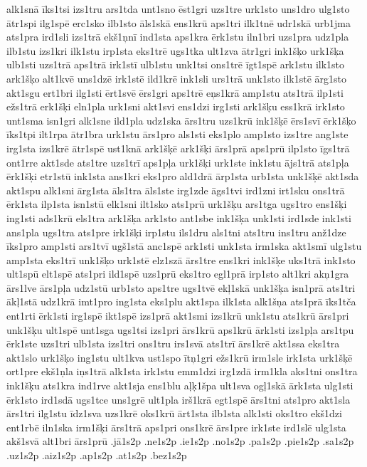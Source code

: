 {alk1snā
īks1tsi
izs1tru
ars1tda
unt1sno
ēst1gri
uzs1tre
urk1sto
uns1dro
ulg1sto
ātr1spi
ilg1spē
erc1sko
ilb1sto
āls1skā
ens1krū
aps1tri
ilk1tnē
udr1skā
urb1jma
ats1pra
ird1sli
izs1trā
ekš1ņnī
ind1sta
aps1kra
ērk1stu
iln1bri
uzs1pra
udz1pla
ilb1stu
izs1kri
ilk1stu
irp1sta
eks1trē
ugs1tka
ult1zva
ātr1gri
ink1šķo
urk1šķa
ulb1sti
uzs1trā
aps1trā
irk1stī
ulb1stu
unk1tsi
ons1trē
īgt1spē
ark1stu
ilk1sto
ark1šķo
alt1kvē
uns1dzē
irk1stē
ild1krē
ink1sli
urs1trā
unk1sto
ilk1stē
ārg1sto
akt1sgu
ert1bri
ilg1sti
ērt1svē
ērs1gri
aps1trē
eņs1krā
amp1stu
ats1trā
ilp1sti
ežs1trā
erk1šķi
eln1pla
urk1sni
akt1svi
ens1dzi
irg1sti
ark1šķu
ess1krā
irk1sto
unt1sma
isn1gri
alk1sne
ild1pla
udz1ska
ārs1tru
uzs1krū
ink1šķē
ērs1svī
ērk1šķo
īks1tpi
ilt1rpa
ātr1bra
urk1stu
ārs1pro
als1sti
eks1plo
amp1sto
izs1tre
ang1ste
irg1sta
izs1krē
ātr1spē
ust1knā
ark1šķē
ark1šķi
ārs1prā
aps1prū
ilp1sto
īgs1trā
ont1rre
akt1sde
ats1tre
uzs1trī
aps1pļa
urk1šķi
urk1ste
ink1stu
ājs1trā
ats1pļa
ērk1šķi
etr1stū
ink1sta
ans1kri
eks1pro
ald1drā
ārp1sta
urb1sta
unk1šķē
akt1sda
akt1spu
alk1sni
ārg1sta
āls1tra
āls1ste
irg1zde
āgs1tvi
ird1zni
irt1sku
ons1trā
ērk1sta
ilp1sta
isn1stū
elk1sni
ilt1sko
ats1prū
urk1šķu
ars1tga
ugs1tro
ens1šķi
ing1sti
ads1krū
els1tra
ark1šķa
ark1sto
ant1sbe
ink1šķa
unk1sti
ird1sde
ink1sti
ans1pla
ugs1tra
ats1pre
irk1šķi
irp1stu
ils1dru
als1tni
ats1tru
ins1tru
anž1dze
īks1pro
amp1sti
ars1tvī
ugš1stā
anc1spē
ark1sti
unk1sta
irm1ska
akt1smī
ulg1stu
amp1sta
eks1trī
unk1šķo
urk1stē
elz1szā
ārs1tre
ens1kri
ink1šķe
uks1trā
ink1sto
ult1spū
elt1spē
ats1pri
ild1spē
uzs1prū
eks1tro
egl1prā
irp1sto
alt1kri
akņ1gra
ārs1lve
ārs1pļa
udz1stū
urb1sto
aps1tre
ugs1tvē
ekļ1skā
unk1šķa
isn1prā
ats1tri
ākļ1stā
udz1krā
imt1pro
ing1sta
eks1plu
akt1spa
ilk1sta
alk1šņa
ats1prā
īks1tča
ent1rti
ērk1sti
irg1spē
ikt1spē
izs1prā
akt1smi
izs1krū
unk1stu
ats1krū
ārs1pri
unk1šķu
ult1spē
unt1sga
ugs1tsi
izs1pri
ārs1krū
aps1krū
ārk1sti
izs1pļa
ars1tpu
ērk1ste
uzs1tri
ulb1sta
izs1tri
ons1tru
irs1svā
ats1trī
ārs1krē
akt1ssa
eks1tra
akt1slo
urk1šķo
ing1stu
ult1kva
ust1spo
ītņ1gri
ežs1krū
irm1sle
irk1sta
urk1šķē
ort1pre
ekš1ņla
iņs1trā
alk1sta
irk1stu
emm1dzi
irg1zdā
irm1kla
aks1tni
ons1tra
ink1šķu
ats1kra
ind1rve
akt1sja
ens1blu
aļķ1špa
ult1sva
ogļ1skā
ārk1sta
ulg1sti
ērk1sto
ird1sdā
ugs1tce
uns1grē
ult1pla
irš1krā
egt1spē
ārs1tni
ats1pro
akt1sla
ārs1tri
ilg1stu
īdz1sva
uzs1krē
oks1krū
ārt1sta
ilb1sta
alk1sti
oks1tro
ekš1dzi
ent1rbē
iln1ska
irm1šķi
ārs1trā
aps1pri
ons1krē
ārs1pre
irk1ste
ird1slē
ulg1sta
akš1svā
alt1bri
ārs1prū
.jā1s2p
.ne1s2p
.ie1s2p
.no1s2p
.pa1s2p
.pie1s2p
.sa1s2p
.uz1s2p
.aiz1s2p
.ap1s2p
.at1s2p
.bez1s2p
}
